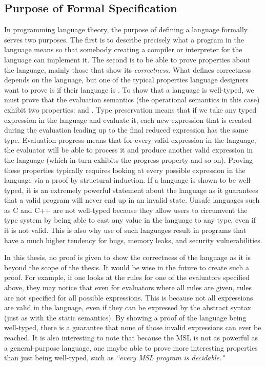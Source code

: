 \subsection{Purpose of Formal Specification}
In programming language theory, the purpose of defining a language formally serves two purposes. The first is to describe precisely what a program in the language means so that somebody creating a compiler or interpreter for the language can implement it. The second is to be able to prove properties about the language, mainly those that show its \emph{correctness}. What defines correctness depends on the language, but one of the typical properties language designers want to prove is if their language is . To show that a language is well-typed, we must prove that the evaluation semantics (the operational semantics in this case) exhibit two properties:  and  \citep{pierce:types}. Type preservation means that if we take any typed expression in the language and evaluate it, each new expression that is created during the evaluation leading up to the final reduced expression has the same type. Evaluation progress means that for every valid expression in the language, the evaluator will be able to process it and produce another valid expression in the language (which in turn exhibits the progress property and so on). Proving these properties typically requires looking at every possible expression in the language via a proof by structural induction. If a language is shown to be well-typed, it is an extremely powerful statement about the language as it guarantees that a valid program will never end up in an invalid state. Unsafe languages such as C and C++ are not well-typed because they allow users to circumvent the type system by being able to cast any value in the language to any type, even if it is not valid. This is also why use of such languages result in programs that have a much higher tendency for bugs, memory leaks, and security vulnerabilities.

In this thesis, no proof is given to show the correctness of the language as it is beyond the scope of the thesis. It would be wise in the future to create such a proof. For example, if one looks at the rules for one of the evaluators specified above, they may notice that even for evaluators where all rules are given, rules are not specified for all possible expressions. This is because not all expressions are valid in the language, even if they can be expressed by the abstract syntax (just as with the static semantics). By showing a proof of the language being well-typed, there is a guarantee that none of those invalid expressions can ever be reached. It is also interesting to note that because the MSL is not as powerful as a general-purpose language, one maybe able to prove more interesting properties than just being well-typed, such as \textit{``every MSL program is decidable."}

